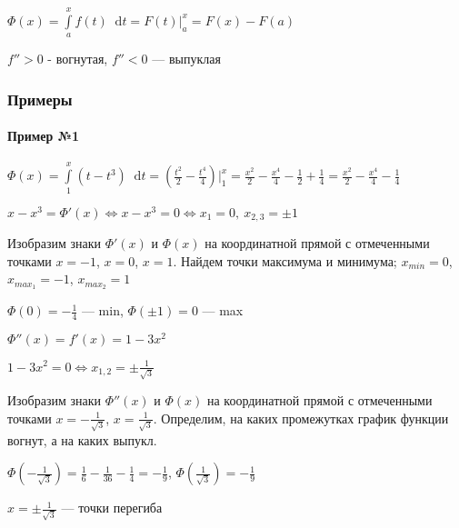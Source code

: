\documentclass{article}
\newcommand*\diff{\mathop{}\!\mathrm{d}}
\begin{document}
$\Phi(x) = \int\limits_{a}^{x} f(t) \diff t = F(t) \bigg|_{a}^{x} = F(x) - F(a)$


\hfill

$f'' > 0$ - вогнутая, $f'' < 0$ — выпуклая

\subsubsection{Примеры}

\paragraph{Пример №1} $\Phi(x) = \int\limits_{1}^{x} (t - t^3) \diff t = (\frac{t^2}{2} - \frac{t^4}{4}) \bigg|_{1}^{x} = \frac{x^2}{2} - \frac{x^4}{4} - \frac{1}{2} + \frac{1}{4} = \frac{x^2}{2} - \frac{x^4}{4} - \frac{1}{4}$

$x - x^3 = \Phi'(x) \Longleftrightarrow x - x^3 = 0 \Longleftrightarrow x_1 = 0, \ x_{2, 3} = \pm 1$

Изобразим знаки $\Phi'(x)$ и $\Phi(x)$ на координатной прямой с отмеченными точками $x = -1$, $x = 0$, $x = 1$. Найдем точки максимума и минимума; $x_{min} = 0$, $x_{max_1} = -1$, $x_{max_2} = 1$

$\Phi(0) = - \frac{1}{4}$ — min, $\Phi(\pm 1) = 0$ — max

\hfill

$\Phi''(x) = f'(x) = 1 - 3x^2$

$1 - 3x^2 = 0 \Longleftrightarrow x_{1, 2} = \pm \frac{1}{\sqrt{3}}$

Изобразим знаки $\Phi''(x)$ и $\Phi(x)$ на координатной прямой с отмеченными точками $x = -\frac{1}{\sqrt{3}}$, $x = \frac{1}{\sqrt{3}}$. Определим, на каких промежутках график функции вогнут, а на каких выпукл.


$\Phi(-\frac{1}{\sqrt{3}}) = \frac{1}{6} - \frac{1}{36} - \frac{1}{4} = -\frac{1}{9}$, $\Phi(\frac{1}{\sqrt{3}}) = -\frac{1}{9}$

$x = \pm \frac{1}{\sqrt{3}}$ — точки перегиба
\end{document}
